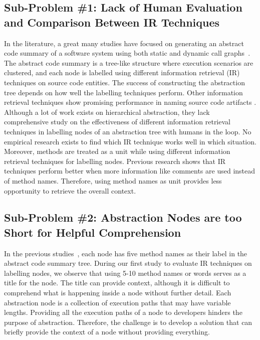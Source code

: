    \subsection{Sub-Problem \#1: Lack of Human Evaluation and Comparison Between IR Techniques} In the literature, a great many studies have focused on generating an abstract code summary of a software system using both static and dynamic call graphs~\cite{feng2018hierarchicalExecutionComprehension, gharibi2018automaticStaticCluster, xin2019identifyingFeaturesExecution}. The abstract code summary is a tree-like structure where execution scenarios are clustered, and each node is labelled using different information retrieval (IR) techniques on source code entities. The success of constructing the abstraction tree depends on how well the labelling techniques perform. Other information retrieval techniques show promising performance in naming source code artifacts \cite{chen2016topicMiningRepositories, panichella2013topicModelsTasks, sun2016surveyTopicSE}. Although a lot of work exists on hierarchical abstraction, they lack comprehensive study on the effectiveness of different information retrieval techniques in labelling nodes of an abstraction tree with humans in the loop. No empirical research exists to find which IR technique works well in which situation.
Moreover, methods are treated as a unit \cite{gharibi2018automaticStaticCluster, feng2018hierarchicalExecutionComprehension} while using different information retrieval techniques for labelling nodes. Previous research \cite{de2012IRMethodsArtifacts} shows that IR techniques perform better when more information like comments are used instead of method names. Therefore, using method names as unit provides less opportunity to retrieve the overall context.
    

    \subsection{Sub-Problem \#2: Abstraction Nodes are too Short for Helpful Comprehension}
    In the previous studies~\cite{feng2018hierarchicalExecutionComprehension, gharibi2018automaticStaticCluster}, each node has five method names as their label in the abstract code summary tree. During our first study to evaluate IR techniques on labelling nodes, we observe that using 5-10 method names or words serves as a title for the node. The title can provide context, although it is difficult to comprehend what is happening inside a node without further detail. Each abstraction node is a collection of execution paths that may have variable lengths. Providing all the execution paths of a node to developers hinders the purpose of abstraction. Therefore, the challenge is to develop a solution that can briefly provide the context of a node without providing everything. 
   
